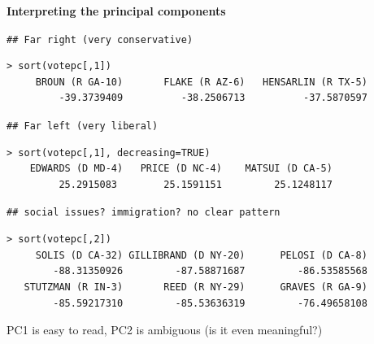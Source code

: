 \documentclass[11pt,xcolor=svgnames]{beamer}
\newcommand{\theme}{\color{Maroon}}
\newcommand{\gr}{\color{black!60}}
\newcommand{\sg}{\color{DarkSlateGray}}
\newcommand{\nv}{\color{Navy}}
\newcommand{\sk}{\vspace{.5cm}}
\begin{document}
\begin{frame}[fragile]

{\bf Interpreting the principal components}

\sk
{\scriptsize \nv

{\theme \tt \#\# Far right (very conservative) \vspace{-.25cm}}
\begin{verbatim}
> sort(votepc[,1])
     BROUN (R GA-10)       FLAKE (R AZ-6)   HENSARLIN (R TX-5) 
         -39.3739409          -38.2506713          -37.5870597 
\end{verbatim}

{\theme \tt \#\# Far left (very liberal) \vspace{-.25cm}}
\begin{verbatim}
> sort(votepc[,1], decreasing=TRUE)
    EDWARDS (D MD-4)   PRICE (D NC-4)    MATSUI (D CA-5)      
         25.2915083        25.1591151         25.1248117     
\end{verbatim}       
  

{\theme \tt \#\# social issues? immigration? no clear pattern\vspace{-.25cm}}
\begin{verbatim}
> sort(votepc[,2])
     SOLIS (D CA-32) GILLIBRAND (D NY-20)      PELOSI (D CA-8) 
        -88.31350926         -87.58871687         -86.53585568 
   STUTZMAN (R IN-3)       REED (R NY-29)      GRAVES (R GA-9) 
        -85.59217310         -85.53636319         -76.49658108 
\end{verbatim}
}

\gr PC1 is easy to read, PC2 is ambiguous (is it even meaningful?)
\end{frame}


\end{document}
